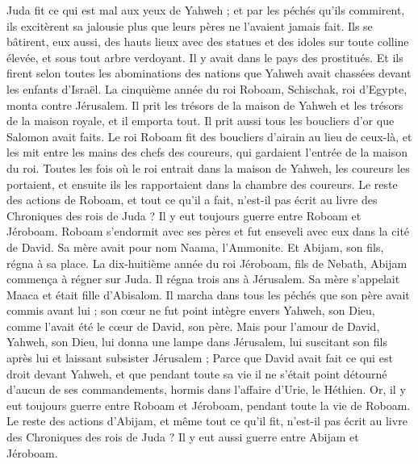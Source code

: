\begin{multicols}{2}
Juda fit ce qui est mal aux yeux de Yahweh ; et par les péchés qu'ils commirent, ils excitèrent sa jalousie plus que leurs pères ne l'avaient jamais fait.
Ils se bâtirent, eux aussi, des hauts lieux avec des statues et des idoles sur toute colline élevée, et sous tout arbre verdoyant.
Il y avait dans le pays des prostitués. Et ils firent selon toutes les abominations des nations que Yahweh avait chassées devant les enfants d'Israël.
La cinquième année du roi Roboam, Schischak, roi d'Egypte, monta contre Jérusalem.
Il prit les trésors de la maison de Yahweh et les trésors de la maison royale, et il emporta tout. Il prit aussi tous les boucliers d'or que Salomon avait faits.
Le roi Roboam fit des boucliers d'airain au lieu de ceux-là, et les mit entre les mains des chefs des coureurs, qui gardaient l’entrée de la maison du roi.
Toutes les fois où le roi entrait dans la maison de Yahweh, les coureurs les portaient, et ensuite ils les rapportaient dans la chambre des coureurs.
Le reste des actions de Roboam, et tout ce qu'il a fait, n'est-il pas écrit au livre des Chroniques des rois de Juda ?
Il y eut toujours guerre entre Roboam et Jéroboam.
Roboam s'endormit avec ses pères et fut enseveli avec eux dans la cité de David. Sa mère avait pour nom Naama, l’Ammonite. Et Abijam, son fils, régna à sa place.
\VerseOne{}La dix-huitième année du roi Jéroboam, fils de Nebath, Abijam commença à régner sur Juda.
Il régna trois ans à Jérusalem. Sa mère s’appelait Maaca et était fille d'Abisalom.
Il marcha dans tous les péchés que son père avait commis avant lui ; son cœur ne fut point intègre envers Yahweh, son Dieu, comme l'avait été le cœur de David, son père.
Mais pour l'amour de David, Yahweh, son Dieu, lui donna une lampe dans Jérusalem, lui suscitant son fils après lui et laissant subsister Jérusalem ;
Parce que David avait fait ce qui est droit devant Yahweh, et que pendant toute sa vie il ne s'était point détourné d’aucun de ses commandements, hormis dans l'affaire d'Urie, le Héthien.
Or, il y eut toujours guerre entre Roboam et Jéroboam, pendant toute la vie de Roboam.
Le reste des actions d'Abijam, et même tout ce qu'il fit, n'est-il pas écrit au livre des Chroniques des rois de Juda ? Il y eut aussi guerre entre Abijam et Jéroboam.

\end{multicols}
